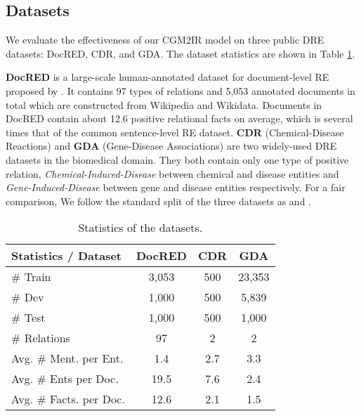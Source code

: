 \documentclass[11pt]{article}
\begin{document}
\subsection{Datasets}

We evaluate the effectiveness of our CGM2IR model on three public DRE datasets: DocRED, CDR, and GDA.
The dataset statistics are shown in Table \ref{tab:statistics}.

\textbf{DocRED} is a large-scale human-annotated dataset for document-level RE proposed by \citep{yao-etal-2019-docred}.
It contains 97 types of relations and 5,053 annotated documents in total which are constructed from Wikipedia and Wikidata.
Documents in DocRED contain about 12.6 positive relational facts on average, which is several times that of the common sentence-level RE dataset.
\textbf{CDR} (Chemical-Disease Reactions) \citep{DBLP:journals/biodb/LiSJSWLDMWL16} and \textbf{GDA} (Gene-Disease Associations) \citep{DBLP:conf/recomb/WuLLTL19} are two widely-used DRE datasets in the biomedical domain.
They both contain only one type of positive relation, \textit{Chemical-Induced-Disease} between chemical and disease entities and \textit{Gene-Induced-Disease} between gene and disease entities respectively.
For a fair comparison, We follow the standard split of the three datasets as \citet{zeng-etal-2020-double} and \citet{DBLP:conf/aaai/Zhou0M021}.

\begin{table}[t]
	\small
	\centering
\begin{tabular}{lccc}
		\toprule
		Statistics / Dataset & DocRED &  CDR & GDA \\
		\midrule
		\# Train & 3,053 &  500 & 23,353 \\
		\# Dev & 1,000 &  500 & 5,839 \\
		\# Test & 1,000 &  500 & 1,000 \\
		\# Relations & 97 &  2 & 2 \\
		Avg. \# Ment. per Ent. & 1.4 &  2.7 & 3.3 \\
		Avg. \# Ents per Doc. & 19.5 &  7.6 & 2.4 \\
		Avg. \# Facts. per Doc. & 12.6 &  2.1 & 1.5 \\
		\bottomrule
	\end{tabular}
\caption{Statistics of the datasets. }
	\label{tab:statistics}
\end{table}
\end{document}
